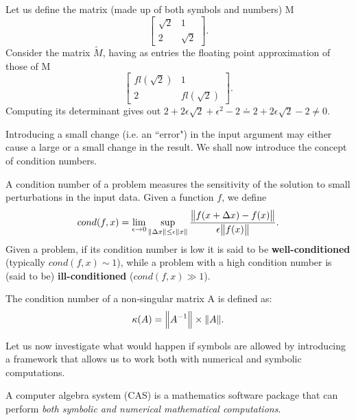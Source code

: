 \begin{example}
    Let us define the matrix (made up of both symbols and numbers) M
    \[
        \begin{bmatrix}
            \sqrt{2}  &   1    \\
                2     & \sqrt{2}
        \end{bmatrix}.
    \]
    Consider the matrix \( \tilde{M} \), having as entries the floating point approximation of those of M
    \[
        \begin{bmatrix}
            fl(\sqrt{2})      &         1      \\
                2             &    fl(\sqrt{2})
        \end{bmatrix}.
    \]
    Computing its determinant gives out \( 2  +2\epsilon\sqrt{2} + \epsilon^2 - 2 \doteq 2 + 2\epsilon\sqrt{2} -2 \neq 0 \).
\end{example}

Introducing a small change (i.e. an ``error") in the input argument may either cause a large or a small change in the result.
We shall now introduce the concept of condition numbers.

\begin{definition}
    A condition number of a problem measures the sensitivity of the solution to small perturbations in the input data.
    Given a function \(f \), we define
    \[
        cond(f, x) = \lim_{\epsilon \to 0} \sup \limits_{\norm{\Delta x} \leq \epsilon \norm{x}}
        \dfrac{\norm{f(x+\Delta x) - f(x)}}{\epsilon \norm{f(x)}}.
    \]
    Given a problem, if its condition number is low it is said to be \textbf{well-conditioned} (typically \( cond(f, x) \sim 1 \)),
    while a problem with a high condition number is (said to be) \textbf{ill-conditioned} (\( cond(f, x) \gg 1 \)).
\end{definition}

\begin{definition}
    The condition number of a non-singular matrix A is defined as:
    \[
        \kappa(A) = \norm{A^{-1}} \times \norm{A}.
    \]
\end{definition}

Let us now investigate what would happen if symbols are allowed by introducing a framework that allows us to work both
with numerical and symbolic computations.
\begin{definition}
    A computer algebra system (CAS) is a mathematics software package that can perform \textit{both symbolic and numerical
    mathematical computations}.
\end{definition}

